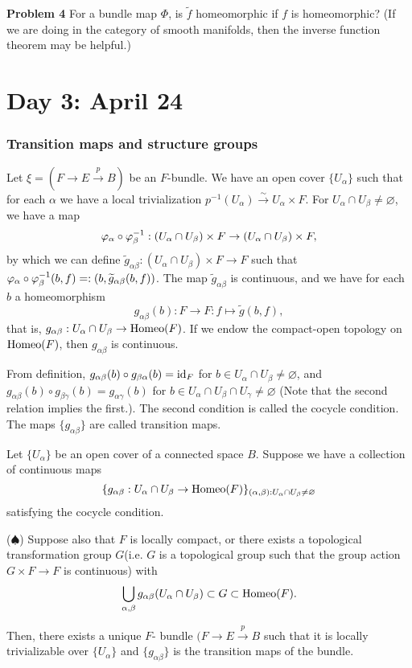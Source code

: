 \documentclass{../../small}
\begin{document}
\textbf{Problem 4} For a bundle map $\Phi$, is $\tilde f$ homeomorphic if $f$ is homeomorphic? (If we are doing in the category of smooth manifolds, then the inverse function theorem may be helpful.)


\newpage
\section{Day 3: April 24}


\subsubsection*{Transition maps and structure groups}
Let $\xi=(F\to E\xrightarrow{p}B)$ be an $F$-bundle.
We have an open cover $\{U_\alpha\}$ such that for each $\alpha$ we have a local trivialization $p^{-1}(U_\alpha)\xrightarrow{\sim}U_\alpha\times F$.
For $U_\alpha\cap U_\beta\ne\varnothing$, we have a map
\[\varphi_\alpha\circ\varphi_\beta^{-1}:(U_\alpha\cap U_\beta)\times F\to(U_\alpha\cap U_\beta)\times F,\]
by which we can define $\tilde g_{\alpha\beta}:(U_\alpha\cap U_\beta)\times F\to F$ such that $\varphi_\alpha\circ\varphi_\beta^{-1}(b,f)=:(b,\widetilde g_{\alpha\beta}(b,f))$.
The map $\tilde g_{\alpha\beta}$ is continuous, and we have for each $b$ a homeomorphism
\[g_{\alpha\beta}(b):F\to F:f\mapsto\tilde g(b,f),\]
that is, $g_{\alpha\beta}:U_\alpha\cap U_\beta\to\operatorname{Homeo}(F)$.
If we endow the compact-open topology on $\operatorname{Homeo}(F)$, then $g_{\alpha\beta}$ is continuous.

From definition, $g_{\alpha\beta}(b)\circ g_{\beta\alpha}(b)=\operatorname{id}_F$ for $b\in U_\alpha\cap U_\beta\ne\varnothing$, and $g_{\alpha\beta}(b)\circ g_{\beta\gamma}(b)=g_{\alpha\gamma}(b)$ for $b\in U_\alpha\cap U_\beta\cap U_\gamma\ne\varnothing$
(Note that the second relation implies the first.).
The second condition is called the cocycle condition.
The maps $\{g_{\alpha\beta}\}$ are called transition maps.

\setcounter{section}{2}
\setcounter{thm}{4}
\begin{thm}
Let $\{U_\alpha\}$ be an open cover of a connected space $B$.
Suppose we have a collection of continuous maps
\[\{g_{\alpha\beta}:U_\alpha\cap U_\beta\to\operatorname{Homeo}(F)\}_{(\alpha,\beta):U_\alpha\cap U_\beta\ne\varnothing}\] satisfying the cocycle condition.

($\spadesuit$) Suppose also that $F$ is locally compact, or there exists a topological transformation group $G$(i.e. $G$ is a topological group such that the group action $G\times F\to F$ is continuous) with
\[\bigcup_{\alpha,\beta}g_{\alpha\beta}(U_\alpha\cap U_\beta)\subset G\subset\operatorname{Homeo}(F).\]

Then, there exists a unique $F$- bundle $(F\to E\xrightarrow{p}B$ such that it is locally trivializable over $\{U_\alpha\}$ and $\{g_{\alpha\beta}\}$ is the transition maps of the bundle.
\end{thm}
\end{document}
